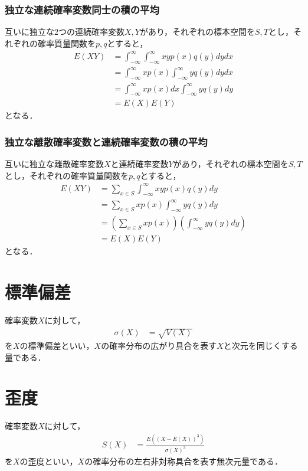 \documentclass[dvipdfmx]{jsarticle}
\begin{document}
 \subsubsection{独立な連続確率変数同士の積の平均}
互いに独立な2つの連続確率変数$X,Y$があり，それぞれの標本空間を$S,T$とし，それぞれの確率質量関数を$p,q$とすると，
 \begin{align}
  E\left(XY\right)&=\int_{-\infty}^\infty\int_{-\infty}^\infty xyp\left(x\right)q\left(y\right)dydx\nonumber\\
  &=\int_{-\infty}^\infty xp\left(x\right)\int_{-\infty}^\infty yq\left(y\right)dydx\nonumber\\
  &=\int_{-\infty}^\infty xp\left(x\right)dx\int_{-\infty}^\infty yq\left(y\right)dy\nonumber\\
  &=E\left(X\right)E\left(Y\right)
 \end{align}
となる．
 \subsubsection{独立な離散確率変数と連続確率変数の積の平均}
互いに独立な離散確率変数$X$と連続確率変数$Y$があり，それぞれの標本空間を$S,T$とし，それぞれの確率質量関数を$p,q$とすると，
 \begin{align}
  E\left(XY\right)&=\sum_{x\in S}\int_{-\infty}^\infty xyp\left(x\right)q\left(y\right)dy\nonumber\\
  &=\sum_{x\in S}xp\left(x\right)\int_{-\infty}^\infty yq\left(y\right)dy\nonumber\\
  &=\left(\sum_{x\in S}xp\left(x\right)\right)\left(\int_{-\infty}^\infty yq\left(y\right)dy\right)\nonumber\\
  &=E\left(X\right)E\left(Y\right)
 \end{align}
となる．
 \section{標準偏差}
確率変数$X$に対して，
 \begin{align}
  \sigma\left(X\right)&=\sqrt{V\left(X\right)}
 \end{align}
を$X$の標準偏差といい，$X$の確率分布の広がり具合を表す$X$と次元を同じくする量である．
 \section{歪度}
確率変数$X$に対して，
 \begin{align}
  S\left(X\right)&=\frac{E\left(\left(X-E\left(X\right)\right)^3\right)}{\sigma\left(X\right)^3}
 \end{align}
を$X$の歪度といい，$X$の確率分布の左右非対称具合を表す無次元量である．
\end{document}
